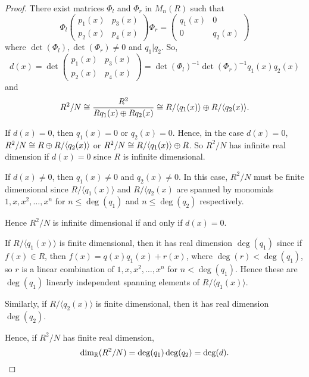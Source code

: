 \documentclass{unswmaths}
\begin{document}
\begin{proof}
    There exist matrices $\Phi_l$ and $\Phi_r$ in $M_n(R)$ such that
    \begin{equation*}
        \Phi_l\begin{pmatrix}
            p_1(x) & p_3(x)\\
            p_2(x) & p_4(x)
        \end{pmatrix}\Phi_r = \begin{pmatrix}
            q_1(x) & 0\\
            0 & q_2(x)
        \end{pmatrix}
    \end{equation*}
    where $\det(\Phi_l),\det(\Phi_r) \neq 0$ and $q_1|q_2$. So,
    \begin{equation*}
        d(x) = \det\begin{pmatrix}
            p_1(x) & p_3(x)\\
            p_2(x) & p_4(x)
        \end{pmatrix} = \det(\Phi_l)^{-1}\det(\Phi_r)^{-1}q_1(x)q_2(x)
    \end{equation*}
    and
    \begin{equation*}
        R^2/N \cong \frac{R^2}{Rq_1(x)\oplus Rq_2(x)} \cong R/\langle q_1(x)\rangle \oplus R/\langle q_2(x)\rangle.
    \end{equation*}
    
    If $d(x) = 0$, then $q_1(x) = 0$ or $q_2(x) = 0$. Hence, in the case
    $d(x) = 0$, $R^2/N \cong R\oplus R/\langle q_2(x)\rangle$ or $R^2/N \cong R/\langle q_1(x)\rangle \oplus R$.
    So $R^2/N$ has infinite real dimension if $d(x) = 0$ since $R$ is infinite dimensional.
    
    If $d(x) \neq 0$, then $q_1(x) \neq 0$ and $q_2(x) \neq 0$. In this case, 
    $R^2/N$ must be finite dimensional since $R/\langle q_1(x)\rangle$ and $R/\langle q_2(x)$
    are spanned by monomials $1,x,x^2,\ldots,x^n$ for $n\leq \deg(q_1)$ and $n\leq \deg(q_2)$ respectively.
    
    Hence $R^2/N$ is infinite dimensional if and only if $d(x) = 0$.     
    
    If $R/\langle q_1(x)\rangle$ is finite dimensional, then it has real dimension $\deg(q_1)$
    since if $f(x) \in R$, then $f(x) = q(x)q_1(x) + r(x)$, where $\deg(r) < \deg(q_1)$, so 
    $r$ is a linear combination of $1,x,x^2,\ldots,x^n$ for $n < \deg(q_1)$. Hence these
    are $\deg(q_1)$ linearly independent spanning elements of $R/\langle q_1(x)\rangle$. 
    
    Similarly, if $R/\langle q_2(x)\rangle$ is finite dimensional, then it has real
    dimension $\deg(q_2)$.
    
    Hence, if $R^2/N$ has finite real dimension, 
    \begin{equation*}
        \dim_{\mathbb{R}}(R^2/N) = \deg(q_1)\deg(q_2) = \deg(d).
    \end{equation*}
\end{proof}
\end{document}
